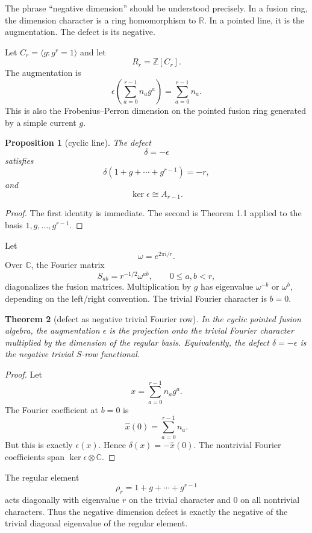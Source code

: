 \documentclass[11pt]{article}
\newtheorem{theorem}{Theorem}[section]
\newtheorem{proposition}[theorem]{Proposition}
\theoremstyle{remark}
\newcommand{\ZZ}{\mathbb Z}
\newcommand{\RR}{\mathbb R}
\newcommand{\CC}{\mathbb C}
\begin{document}
The phrase ``negative dimension'' should be understood precisely.  In a fusion ring, the dimension character is a ring homomorphism to $\RR$.  In a pointed line, it is the augmentation.  The defect is its negative.

Let $C_r=\langle g:g^r=1\rangle$ and let
\[
        R_r=\ZZ[C_r].
\]
The augmentation is
\[
        \epsilon\left(\sum_{a=0}^{r-1}n_ag^a\right)=\sum_{a=0}^{r-1}n_a.
\]
This is also the Frobenius--Perron dimension on the pointed fusion ring generated by a simple current $g$.

\begin{proposition}[cyclic line]
The defect
\[
        \delta=-\epsilon
\]
satisfies
\[
        \delta(1+g+\cdots+g^{r-1})=-r,
\]
and
\[
        \ker\epsilon\cong A_{r-1}.
\]
\end{proposition}

\begin{proof}
The first identity is immediate.  The second is Theorem 1.1 applied to the basis $1,g,\ldots,g^{r-1}$.\end{proof}

Let
\[
        \omega=e^{2\pi i/r}.
\]
Over $\CC$, the Fourier matrix
\[
        S_{ab}=r^{-1/2}\omega^{ab},
        \qquad 0\le a,b<r,
\]
diagonalizes the fusion matrices.  Multiplication by $g$ has eigenvalue $\omega^{-b}$ or $\omega^b$, depending on the left/right convention.  The trivial Fourier character is $b=0$.

\begin{theorem}[defect as negative trivial Fourier row]
In the cyclic pointed fusion algebra, the augmentation $\epsilon$ is the projection onto the trivial Fourier character multiplied by the dimension of the regular basis.  Equivalently, the defect $\delta=-\epsilon$ is the negative trivial $S$-row functional.
\end{theorem}

\begin{proof}
Let
\[
        x=\sum_{a=0}^{r-1}n_ag^a.
\]
The Fourier coefficient at $b=0$ is
\[
        \widehat x(0)=\sum_{a=0}^{r-1}n_a.
\]
But this is exactly $\epsilon(x)$.  Hence $\delta(x)=-\widehat x(0)$.  The nontrivial Fourier coefficients span $\ker\epsilon\otimes\CC$.\end{proof}

The regular element
\[
        \rho_r=1+g+\cdots+g^{r-1}
\]
acts diagonally with eigenvalue $r$ on the trivial character and $0$ on all nontrivial characters.  Thus the negative dimension defect is exactly the negative of the trivial diagonal eigenvalue of the regular element.
\end{document}
